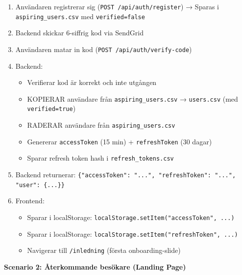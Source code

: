 \documentclass[12pt,a4paper]{article}
\begin{document}
\begin{enumerate}[noitemsep]
  \item Användaren registrerar sig (\texttt{POST /api/auth/register}) → Sparas i \texttt{aspiring\_users.csv} med \texttt{verified=false}
  \item Backend skickar 6-siffrig kod via SendGrid
  \item Användaren matar in kod (\texttt{POST /api/auth/verify-code})
  \item Backend:
    \begin{itemize}[noitemsep]
      \item Verifierar kod är korrekt och inte utgången
      \item KOPIERAR användare från \texttt{aspiring\_users.csv} → \texttt{users.csv} (med \texttt{verified=true})
      \item RADERAR användare från \texttt{aspiring\_users.csv}
      \item Genererar \texttt{accessToken} (15 min) + \texttt{refreshToken} (30 dagar)
      \item Sparar refresh token hash i \texttt{refresh\_tokens.csv}
    \end{itemize}
  \item Backend returnerar: \texttt{\{"accessToken": "...", "refreshToken": "...", "user": \{...\}\}}
  \item Frontend:
    \begin{itemize}[noitemsep]
      \item Sparar i localStorage: \texttt{localStorage.setItem("accessToken", ...)}
      \item Sparar i localStorage: \texttt{localStorage.setItem("refreshToken", ...)}
      \item Navigerar till \texttt{/inledning} (första onboarding-slide)
    \end{itemize}
\end{enumerate}

\textbf{Scenario 2: Återkommande besökare (Landing Page)}
\end{document}
